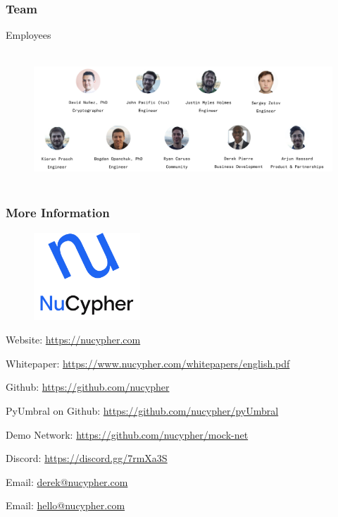\documentclass[xetex,mathsans,sans,aspectratio=169]{beamer}
\begin{document}
    \begin{frame}
      \frametitle{Team}
      Employees
      \begin{figure}
        \centering
        \includegraphics[height=5cm]{pdf/employees.pdf}
      \end{figure}
    \end{frame}

    \begin{frame}
        \frametitle{More Information}
        \begin{figure}
            \centering
            \includegraphics[width=4cm]{pdf/nucypher_logo.pdf}
        \end{figure}
        Website: \url{https://nucypher.com}

        Whitepaper: \url{https://www.nucypher.com/whitepapers/english.pdf}

        Github: \url{https://github.com/nucypher}

        PyUmbral on Github: \url{https://github.com/nucypher/pyUmbral}

        Demo Network: \url{https://github.com/nucypher/mock-net}

        Discord: \url{https://discord.gg/7rmXa3S}

        Email: \href{mailto:derek@nucypher.com}{derek@nucypher.com}

        Email: \href{mailto:hello@nucypher.com}{hello@nucypher.com}
    \end{frame}
\end{document}
